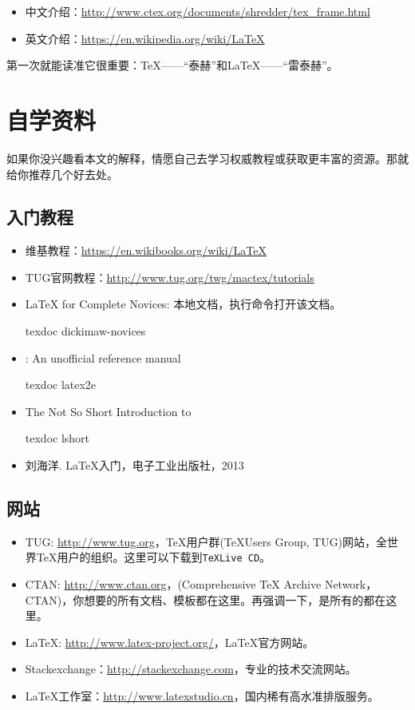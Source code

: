 \documentclass{hitec}
\begin{document}
\begin{itemize}
\item 中文介绍：\url{http://www.ctex.org/documents/shredder/tex_frame.html}
\item 英文介绍：\url{https://en.wikipedia.org/wiki/LaTeX}
\end{itemize}

第一次就能读准它很重要：\TeX{}——“泰赫”和\LaTeX{}——“雷泰赫”。

\section{自学资料}
如果你没兴趣看本文的解释，情愿自己去学习权威教程或获取更丰富的资源。那就给你推荐几个好去处。

\subsection{入门教程}
\begin{itemize}
\item 维基教程：\url{https://en.wikibooks.org/wiki/LaTeX}
\item TUG官网教程：\url{http://www.tug.org/twg/mactex/tutorials}
\item \LaTeX{} for Complete Novices: 本地文档，执行命令打开该文档。 
  \begin{cmd}
texdoc dickimaw-novices
  \end{cmd}
 \item \LaTeXe{}: An unofficial reference manual
  \begin{cmd}
texdoc latex2e
  \end{cmd}
 \item The Not So Short Introduction to \LaTeXe{}
   \begin{cmd}  
texdoc lshort
   \end{cmd}
\item 刘海洋. \LaTeX{}入门，电子工业出版社，2013
\end{itemize}

\subsection{网站}

\begin{itemize}
\item TUG: \url{http://www.tug.org}，\TeX{}用户群(\TeX Users Group, TUG)网站，全世界\TeX{}用户的组织。这里可以下载到\texttt{TeXLive CD}。
\item CTAN: \url{http://www.ctan.org}，(Comprehensive TeX Archive Network，CTAN)，你想要的所有文档、模板都在这里。再强调一下，是所有的都在这里。
\item LaTeX: \url{http://www.latex-project.org/}，\LaTeX{}官方网站。
\item Stackexchange：\url{http://stackexchange.com}，专业的技术交流网站。 
\item \LaTeX{}工作室：\url{http://www.latexstudio.cn}，国内稀有高水准排版服务。
\end{itemize}
\end{document}
